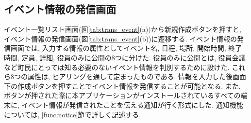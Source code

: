 \subsection{イベント情報の発信画面}%
イベント一覧リスト画面(図\ref{tab:trans_event}(a))から新規作成ボタンを押すと, イベント情報の発信画面(図\ref{tab:trans_event}(b))に遷移する. イベント情報の発信画面では, 入力する情報の属性としてイベント名, 日程, 場所, 開始時間, 終了時間, 定員, 詳細, 役員のみに公開の8つに分けた. 役員のみに公開とは, 役員会議など町民にとっては知る必要のないイベント情報を判別するために設けた. これら8つの属性は, ヒアリングを通して定まったものである. 情報を入力した後画面下の作成ボタンを押すことでイベント情報を発信することが可能となる. また, ボタンが押された際に本アプリケーションがインストールされているすべての端末に, イベント情報が発信されたことを伝える通知が行く形式にした. 通知機能については, \ref{func:notice}節で詳しく記述する.

